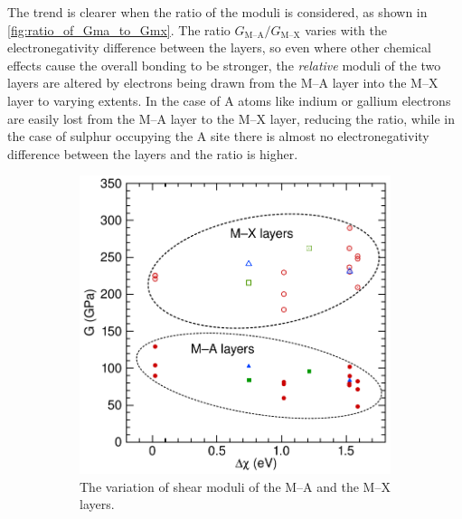 The trend is clearer when the ratio of the moduli is considered, as shown in \autoref{fig:ratio_of_Gma_to_Gmx}. The ratio $G_{\text{M--A}}/G_{\text{M--X}}$ varies with the electronegativity difference between the layers, so even where other chemical effects cause the overall bonding to be stronger, the \emph{relative} moduli of the two layers are altered by electrons being drawn from the M--A layer into the M--X layer to varying extents. In the case of A atoms like indium or gallium electrons are easily lost from the M--A layer to the M--X layer, reducing the ratio, while in the case of sulphur occupying the A site there is almost no electronegativity difference between the layers and the ratio is higher.


\begin{figure}
\centering

\begin{subfigure}{0.4\textwidth}
\centering
{}
\includegraphics[width=\textwidth]{Gmx_and_Gma_dX_MAX}
\caption{The variation of shear moduli of the M--A and the M--X layers.  \label{fig:Gma_variation}}
\end{subfigure}
~
\begin{subfigure}{0.4\textwidth}
\centering
{}

\end{subfigure}
\end{figure}
